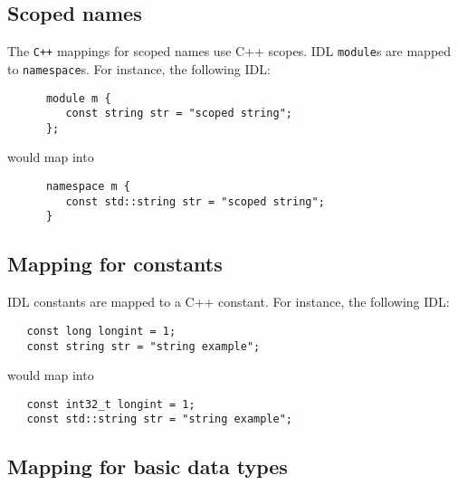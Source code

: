 %
%
%
%
%

\subsection{Scoped names}

The {\tt C++}  mappings for scoped names use C++ scopes.  IDL {\tt module}s are
mapped to {\tt namespace}s. For instance, the following IDL:
\begin{verbatim}
      module m {
         const string str = "scoped string";
      };
\end{verbatim}

would map into
\begin{verbatim}
      namespace m {
         const std::string str = "scoped string";
      }
\end{verbatim}


\subsection{Mapping for constants}

\GenoM{} IDL constants are mapped to a C++ constant. For instance,
the following IDL:
\begin{verbatim}
   const long longint = 1;
   const string str = "string example";
\end{verbatim}

would map into
\begin{verbatim}
   const int32_t longint = 1;
   const std::string str = "string example";
\end{verbatim}


\subsection{Mapping for basic data types}

